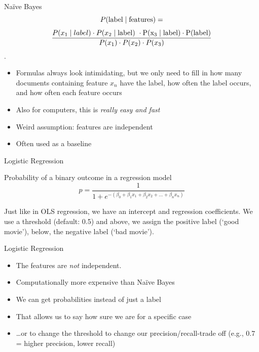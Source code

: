 \documentclass[compress]{beamer}
\begin{document}
\begin{frame}{Na\"ive Bayes}
$$ P(\rm{label} \mid \rm{features}) =$$
$$ \frac{P(x_1 \mid label) \cdot P(x_2 \mid \rm{label})\ \cdot P(x_3 \mid label) \cdot P(label)}{P(x_1) \cdot P(x_2) \cdot P(x_3)}$$.

\begin{itemize}
	\item Formulas always look intimidating, but we only need to fill in how many documents containing feature $x_n$ have the label, how often the label occurs, and how often each feature occurs
	\item Also for computers, this is \emph{really easy and fast}
	\item Weird assumption: features are independent
	\item Often used as a baseline
\end{itemize}
\end{frame}




\begin{frame}{Logistic Regression}
	\begin{block}{Probability of a binary outcome in a regression model}
		$$p = \frac{1}{1 + e^{-(\beta_0 + \beta_1 x_1 + \beta_2 x_2 + \ldots + \beta_n x_n)}}$$
	\end{block}
	Just like in OLS regression, we have an intercept and regression coefficients. 
	We use a threshold (default: 0.5) and above, we assign the positive label (`good movie'), below, the negative label (`bad movie').
\end{frame}
\begin{frame}{Logistic Regression}
	\begin{itemize}[<+->]
		\item The features are \emph{not} independent.
		\item Computationally more expensive than Naïve Bayes
		\item We can get probabilities instead of just a label
		\item That allows us to say how sure we are for a specific case
		\item \ldots or to change the threshold to change our precision/recall-trade off (e.g., 0.7 = higher precision, lower recall)
	\end{itemize}
\end{frame}
\end{document}
